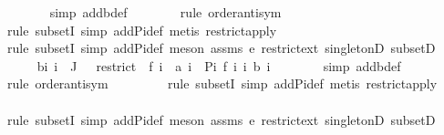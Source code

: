\begin{isabellebody}
\ \ \ \ \ \ \isamarkupfalse%
\ {\isacharparenleft}{\kern0pt}simp\ add{\isacharcolon}{\kern0pt}b{\isacharunderscore}{\kern0pt}def{\isacharparenright}{\kern0pt}\isanewline
\ \ \ \ \ \ \isamarkupfalse%
\ {\isacharparenleft}{\kern0pt}rule\ order{\isacharunderscore}{\kern0pt}antisym{\isacharparenright}{\kern0pt}\isanewline
\ \ \ \ \ \ \ \isamarkupfalse%
\ {\isacharparenleft}{\kern0pt}rule\ subsetI{\isacharcomma}{\kern0pt}\ simp\ add{\isacharcolon}{\kern0pt}Pi{\isacharunderscore}{\kern0pt}def{\isacharcomma}{\kern0pt}\ metis\ restrict{\isacharunderscore}{\kern0pt}apply{\isacharprime}{\kern0pt}{\isacharparenright}{\kern0pt}\isanewline
\ \ \ \ \ \ \isamarkupfalse%
\ {\isacharparenleft}{\kern0pt}rule\ subsetI{\isacharcomma}{\kern0pt}\ simp\ add{\isacharcolon}{\kern0pt}Pi{\isacharunderscore}{\kern0pt}def{\isacharcomma}{\kern0pt}\ meson\ assms{\isacharparenleft}{\kern0pt}{}{\isacharparenright}{\kern0pt}\ e\ restrict{\isacharunderscore}{\kern0pt}ext\ singletonD\ subsetD{\isacharparenright}{\kern0pt}\isanewline
\ \ \ \ \isamarkupfalse%
\ b{\isacharcolon}{\kern0pt}{\isachardoublequoteopen}{\isasymAnd}i{\isachardot}{\kern0pt}\ i\ {\isasymin}\ J{\isacharprime}{\kern0pt}\ {\isasymLongrightarrow}\ {\isacharbraceleft}{\kern0pt}{\isasymomega}{\isachardot}{\kern0pt}\ restrict\ {\isasymomega}\ {\isacharparenleft}{\kern0pt}f\ i{\isacharparenright}{\kern0pt}\ {\isacharequal}{\kern0pt}\ a\ i{\isacharbraceright}{\kern0pt}\ {\isacharequal}{\kern0pt}\ Pi\ {\isacharparenleft}{\kern0pt}f\ i{\isacharparenright}{\kern0pt}\ {\isacharparenleft}{\kern0pt}{\isasymlambda}i{\isachardot}{\kern0pt}\ {\isacharbraceleft}{\kern0pt}b\ i{\isacharbraceright}{\kern0pt}{\isacharparenright}{\kern0pt}{\isachardoublequoteclose}\isanewline
\ \ \ \ \ \ \isamarkupfalse%
\ {\isacharparenleft}{\kern0pt}simp\ add{\isacharcolon}{\kern0pt}b{\isacharunderscore}{\kern0pt}def{\isacharparenright}{\kern0pt}\isanewline
\ \ \ \ \ \ \isamarkupfalse%
\ {\isacharparenleft}{\kern0pt}rule\ order{\isacharunderscore}{\kern0pt}antisym{\isacharparenright}{\kern0pt}\isanewline
\ \ \ \ \ \ \ \isamarkupfalse%
\ {\isacharparenleft}{\kern0pt}rule\ subsetI{\isacharcomma}{\kern0pt}\ simp\ add{\isacharcolon}{\kern0pt}Pi{\isacharunderscore}{\kern0pt}def{\isacharcomma}{\kern0pt}\ metis\ restrict{\isacharunderscore}{\kern0pt}apply{\isacharprime}{\kern0pt}{\isacharparenright}{\kern0pt}\isanewline
\ \ \ \ \ \ \isamarkupfalse%
\ {\isacharparenleft}{\kern0pt}rule\ subsetI{\isacharcomma}{\kern0pt}\ simp\ add{\isacharcolon}{\kern0pt}Pi{\isacharunderscore}{\kern0pt}def{\isacharcomma}{\kern0pt}\ meson\ assms{\isacharparenleft}{\kern0pt}{}{\isacharparenright}{\kern0pt}\ e\ restrict{\isacharunderscore}{\kern0pt}ext\ singletonD\ subsetD{\isacharparenright}{\kern0pt}\isanewline

\end{isabellebody}
